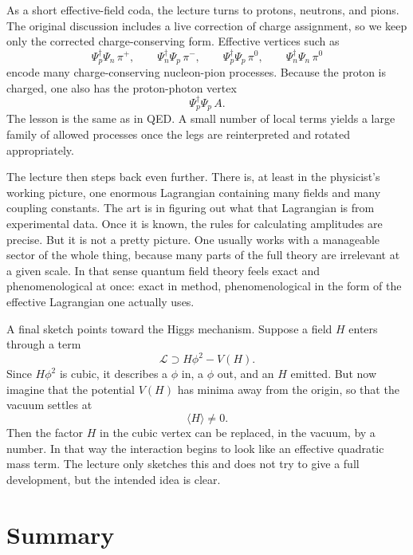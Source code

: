 As a short effective-field coda, the lecture turns to protons, neutrons, and pions. The original discussion includes a live correction of charge assignment, so we keep only the corrected charge-conserving form. Effective vertices such as
\begin{equation}
\Psi_p^\dagger\Psi_n\,\pi^+,
\qquad
\Psi_n^\dagger\Psi_p\,\pi^-,
\qquad
\Psi_p^\dagger\Psi_p\,\pi^0,
\qquad
\Psi_n^\dagger\Psi_n\,\pi^0
\end{equation}
encode many charge-conserving nucleon-pion processes. Because the proton is charged, one also has the proton-photon vertex
\begin{equation}
\Psi_p^\dagger\Psi_p\,A.
\end{equation}
The lesson is the same as in QED. A small number of local terms yields a large family of allowed processes once the legs are reinterpreted and rotated appropriately.

The lecture then steps back even further. There is, at least in the physicist's working picture, one enormous Lagrangian containing many fields and many coupling constants. The art is in figuring out what that Lagrangian is from experimental data. Once it is known, the rules for calculating amplitudes are precise. But it is not a pretty picture. One usually works with a manageable sector of the whole thing, because many parts of the full theory are irrelevant at a given scale. In that sense quantum field theory feels exact and phenomenological at once: exact in method, phenomenological in the form of the effective Lagrangian one actually uses.

A final sketch points toward the Higgs mechanism. Suppose a field \(H\) enters through a term
\begin{equation}
\mathcal L \supset H\phi^2 - V(H).
\end{equation}
Since \(H\phi^2\) is cubic, it describes a \(\phi\) in, a \(\phi\) out, and an \(H\) emitted. But now imagine that the potential \(V(H)\) has minima away from the origin, so that the vacuum settles at
\begin{equation}
\langle H\rangle \neq 0.
\end{equation}
Then the factor \(H\) in the cubic vertex can be replaced, in the vacuum, by a number. In that way the interaction begins to look like an effective quadratic mass term. The lecture only sketches this and does not try to give a full development, but the intended idea is clear.

\section{Summary}

